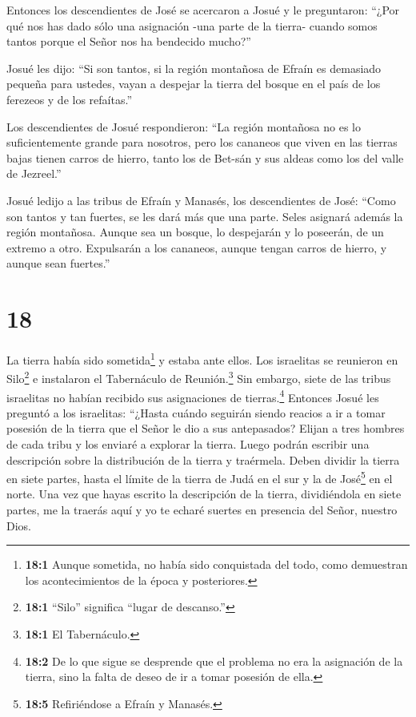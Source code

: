  Entonces los descendientes de José se acercaron a Josué y
le preguntaron: ``¿Por qué nos has dado sólo una asignación -una parte
de la tierra- cuando somos tantos porque el Señor nos ha bendecido
mucho?''

 Josué les dijo: ``Si son tantos, si la región montañosa de
Efraín es demasiado pequeña para ustedes, vayan a despejar la tierra del
bosque en el país de los ferezeos y de los refaítas.''

 Los descendientes de Josué respondieron: ``La región
montañosa no es lo suficientemente grande para nosotros, pero los
cananeos que viven en las tierras bajas tienen carros de hierro, tanto
los de Bet-sán y sus aldeas como los del valle de Jezreel.''

 Josué ledijo a las tribus de Efraín y Manasés, los
descendientes de José: ``Como son tantos y tan fuertes, se les dará más
que una parte.  Seles asignará además la región montañosa.
Aunque sea un bosque, lo despejarán y lo poseerán, de un extremo a otro.
Expulsarán a los cananeos, aunque tengan carros de hierro, y aunque sean
fuertes.''

\hypertarget{section-17}{%
\section{18}\label{section-17}}

 La tierra había sido sometida\footnote{\textbf{18:1} Aunque
  sometida, no había sido conquistada del todo, como demuestran los
  acontecimientos de la época y posteriores.} y estaba ante ellos. Los
israelitas se reunieron en Silo\footnote{\textbf{18:1} ``Silo''
  significa ``lugar de descanso.''} e instalaron el Tabernáculo de
Reunión.\footnote{\textbf{18:1} El Tabernáculo.}  Sin
embargo, siete de las tribus israelitas no habían recibido sus
asignaciones de tierras.\footnote{\textbf{18:2} De lo que sigue se
  desprende que el problema no era la asignación de la tierra, sino la
  falta de deseo de ir a tomar posesión de ella.}  Entonces
Josué les preguntó a los israelitas: ``¿Hasta cuándo seguirán siendo
reacios a ir a tomar posesión de la tierra que el Señor le dio a sus
antepasados?  Elijan a tres hombres de cada tribu y los
enviaré a explorar la tierra. Luego podrán escribir una descripción
sobre la distribución de la tierra y traérmela.  Deben
dividir la tierra en siete partes, hasta el límite de la tierra de Judá
en el sur y la de José\footnote{\textbf{18:5} Refiriéndose a Efraín y
  Manasés.} en el norte.  Una vez que hayas escrito la
descripción de la tierra, dividiéndola en siete partes, me la traerás
aquí y yo te echaré suertes en presencia del Señor, nuestro Dios.

